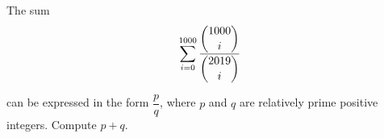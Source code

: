The sum \[\displaystyle\sum_{i=0}^{1000} \dfrac{\dbinom{1000}{i}}{\dbinom{2019}{i}}\]

can be expressed in the form $\dfrac{p}{q}$, where $p$ and $q$ are relatively prime positive integers. Compute $p+q$.

